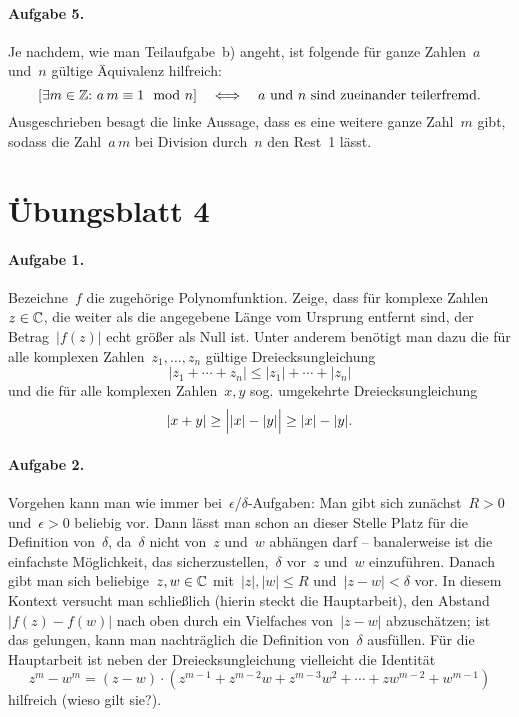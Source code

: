 \documentclass{../algblatt}
\begin{document}
\paragraph{Aufgabe 5.} Je nachdem, wie man Teilaufgabe~b) angeht, ist folgende
für ganze Zahlen~$a$ und~$n$ gültige Äquivalenz hilfreich:
\[ \left[\exists m \in \mathbb{Z}{:}\ a\,m \equiv 1 \mod{n}\right]
  \quad\Longleftrightarrow\quad
  \text{$a$ und~$n$ sind zueinander teilerfremd.} \]
Ausgeschrieben besagt die linke Aussage, dass es eine weitere ganze Zahl~$m$
gibt, sodass die Zahl~$a\,m$ bei Division durch~$n$ den Rest~1 lässt.


\section*{Übungsblatt 4}

\paragraph{Aufgabe 1.} Bezeichne~$f$ die zugehörige Polynomfunktion. Zeige,
dass für komplexe Zahlen~$z \in \mathbb{C}$, die weiter
als die angegebene Länge vom Ursprung entfernt sind, der Betrag~$|f(z)|$ echt
größer als Null ist. Unter anderem benötigt man dazu die für alle komplexen
Zahlen~$z_1,\ldots,z_n$ gültige Dreiecksungleichung
\[ |z_1 + \cdots + z_n| \leq |z_1| + \cdots + |z_n| \]
und die für alle komplexen Zahlen~$x,y$ sog. umgekehrte Dreiecksungleichung
\[ |x + y| \geq \Bigl| |x| - |y| \Bigr| \geq |x| - |y|. \]

\paragraph{Aufgabe 2.} Vorgehen kann man wie immer
bei~$\epsilon$/$\delta$-Aufgaben: Man gibt sich zunächst~$R > 0$ und~$\epsilon > 0$
beliebig vor. Dann lässt man schon an dieser Stelle Platz für die Definition
von~$\delta$, da~$\delta$ nicht von~$z$ und~$w$ abhängen darf -- banalerweise ist die einfachste
Möglichkeit, das sicherzustellen,~$\delta$ vor~$z$ und~$w$ einzuführen.
Danach gibt
man sich beliebige~$z,w \in \mathbb{C}$ mit~$|z|,|w| \leq R$ und~$|z-w| < \delta$ vor.
In diesem Kontext versucht man schließlich (hierin steckt die Hauptarbeit), den
Abstand~$|f(z)-f(w)|$ nach oben durch ein Vielfaches von~$|z-w|$ abzuschätzen;
ist das gelungen, kann man nachträglich die Definition von~$\delta$ ausfüllen.
Für die Hauptarbeit ist neben der Dreiecksungleichung vielleicht die Identität
\[ z^m - w^m = (z - w) \cdot (z^{m-1} + z^{m-2} w + z^{m-3} w^2 + \cdots + z w^{m-2}
+ w^{m-1}) \]
hilfreich (wieso gilt sie?).
\end{document}
